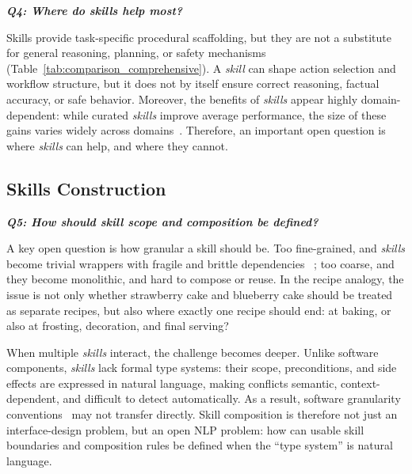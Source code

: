 \documentclass[sigconf,nonacm]{acmart}
\begin{document}
\vspace{+0.04in}
\emph{\textbf{Q4: Where do skills help most? }}  

Skills provide task-specific procedural scaffolding, but they are not a substitute for general reasoning, planning, or safety mechanisms (Table~\ref{tab:comparison_comprehensive}). A \emph{skill} can shape action selection and workflow structure, but it does not by itself ensure correct reasoning, factual accuracy, or safe behavior. Moreover, the benefits of \emph{skills} appear highly domain-dependent: while curated \emph{skills} improve average performance, the size of these gains varies widely across domains~\cite{skillsbench2026}.
Therefore, an important open question is where \emph{skills}  can help, and where they cannot.

\vspace{-7pt}
\subsection{Skills Construction}

\hspace{\parindent}\emph{\textbf{Q5: How should skill scope and composition be defined? }}
\label{sec:q5}

A key open question is how granular a skill should be. Too fine-grained, and \emph{skills} become trivial wrappers with fragile and brittle dependencies ~\cite{abdalkareem2017trivial}; too coarse, and they become monolithic, and hard to compose or reuse. In the recipe analogy, the issue is not only whether strawberry cake and blueberry cake should be treated as separate recipes, but also where exactly one recipe should end: at baking, or also at frosting, decoration, and final serving?

When multiple \emph{skills}  interact, the challenge becomes deeper. Unlike software components, \emph{skills} lack formal type systems: their scope, preconditions, and side effects are expressed in natural language, making conflicts semantic, context-dependent, and difficult to detect automatically. As a result, software granularity conventions~\cite{decan2019emse} may not transfer directly. Skill composition is therefore not just an interface-design problem, but an open NLP problem: how can usable skill boundaries and composition rules be defined   when the ``type system'' is natural language.
\end{document}
